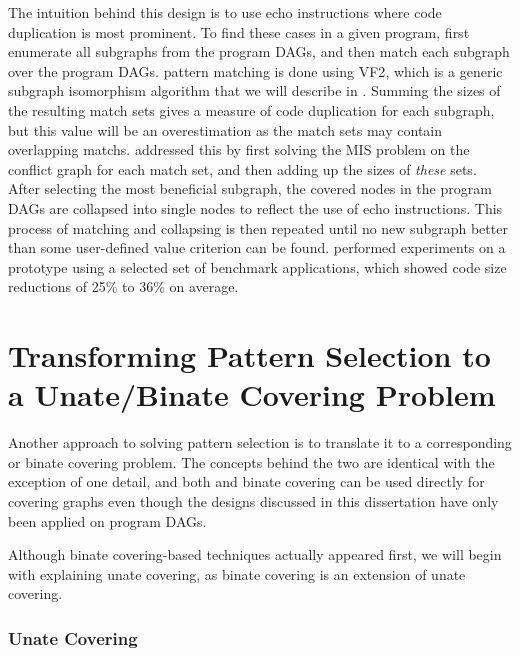 The intuition behind this design is to use \glspl{echo instruction} where code
duplication is most prominent.
%
To find these cases in a given \gls{program},
\citeauthor{Brisk2004} first enumerate all \glspl{subgraph} from the
\glspl{program DAG}, and then match each \gls{subgraph} over the \glspl{program
  DAG}.
%
\Gls{pattern matching} is done using \gls{VF2}, which is a generic
\gls{subgraph isomorphism} algorithm that we will describe in
.
%
Summing the sizes of the resulting \glspl{match set}
gives a measure of code duplication for each \gls{subgraph}, but this value will
be an overestimation as the \glspl{match set} may contain overlapping
\glspl{match}.
%
\citeauthor{Brisk2004} addressed this by first solving the
\gls{MIS problem} on the \gls{conflict graph} for each \gls{match set}, and then
adding up the sizes of \emph{these} sets.
%
After selecting the most beneficial
\gls{subgraph}, the covered \glspl{node} in the \glspl{program DAG} are
collapsed into single \glspl{node} to reflect the use of \glspl{echo
  instruction}.
%
This process of matching and collapsing is then repeated until
no new \gls{subgraph} better than some user-defined value criterion can be
found.
%
\citeauthor{Brisk2004} performed experiments on a prototype using a
selected set of benchmark applications, which showed code size reductions of
25\% to 36\% on average.


\section{Transforming Pattern Selection to a Unate/Binate Covering Problem}

Another approach to solving \gls{pattern selection} is to translate it to a
corresponding  or \gls{binate
  covering} problem.
%
The concepts behind the two are identical with the
exception of one detail, and both  and \gls{binate
  covering} can be used directly for covering \glspl{graph} even though the
designs discussed in this dissertation have only been applied on \glspl{program DAG}.

Although \gls{binate covering}-based techniques actually appeared first, we will
begin with explaining \gls{unate covering}, as \gls{binate covering} is an
extension of \gls{unate covering}.


\subsubsection{Unate Covering}

